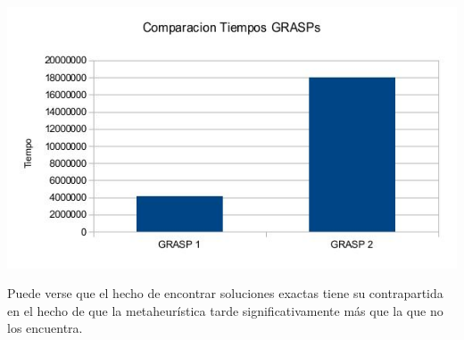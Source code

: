 \includegraphics[scale=0.5]{Ej5/tiempos.jpg}

Puede verse que el hecho de encontrar soluciones exactas tiene su contrapartida en el hecho de que la metaheurística tarde significativamente más que la que no los encuentra.

